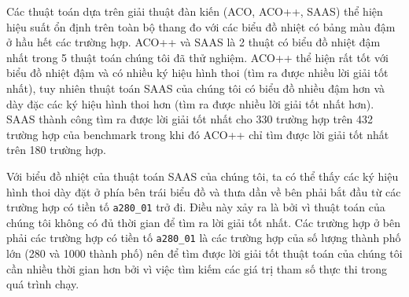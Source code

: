 Các thuật toán dựa trên giải thuật đàn kiến (ACO, ACO++, SAAS) thể hiện hiệu suất ổn định trên toàn bộ thang đo với các biểu đồ nhiệt có bảng màu đậm ở hầu hết các trường hợp. ACO++ và SAAS là 2 thuật có biểu đồ nhiệt đậm nhất trong 5 thuật toán chúng tôi đã thử nghiệm. ACO++ thể hiện rất tốt với biểu đồ nhiệt đậm và có nhiều ký hiệu hình thoi (tìm ra được nhiều lời giải tốt nhất), tuy nhiên thuật toán SAAS của chúng tôi có biểu đồ nhiều đậm hơn và dày đặc các ký hiệu hình thoi hơn (tìm ra được nhiều lời giải tốt nhất hơn). SAAS thành công tìm ra được lời giải tốt nhất cho 330 trường hợp trên 432 trường hợp của benchmark trong khi đó ACO++ chỉ tìm được lời giải tốt nhất trên 180 trường hợp.

Với biểu đồ nhiệt của thuật toán SAAS của chúng tôi, ta có thể thấy các ký hiệu hình thoi dày đặt ở phía bên trái biểu đồ và thưa dần về bên phải bắt đầu từ các trường hợp có tiền tố  \texttt{a280\_01} trở đi. Điều này xảy ra là bởi vì thuật toán của chúng tôi không có đủ thời gian để tìm ra lời giải tốt nhất. Các trường hợp ở bên phải các trường hợp có tiền tố  \texttt{a280\_01} là các trường hợp của số lượng thành phố lớn (280 và 1000 thành phố) nên để tìm được lời giải tốt thuật toán của chúng tôi cần nhiều thời gian hơn bởi vì việc tìm kiếm các giá trị tham số thực thi trong quá trình chạy. 

